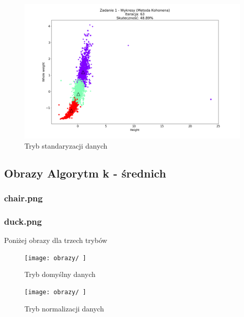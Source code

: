 \documentclass{classrep}
\begin{document}
{{{\begin{figure}[!htbp]
\centering
\includegraphics[width=\textwidth,width=90mm]{wykresy/plot_kohonenAbaloneStandardised.png}
\caption{Tryb standaryzacji danych}
\end{figure}
\FloatBarrier
}

\subsection{Obrazy Algorytm k - średnich}
{
\subsubsection{chair.png}
{
}

\subsubsection{duck.png}
{\iffalse
Poniżej obrazy dla trzech trybów
\begin{figure}[!htbp]
\centering
\texttt{[image: obrazy/ ]}
\caption{Tryb domyślny danych}
\end{figure}

\begin{figure}[!htbp]
\centering
\texttt{[image: obrazy/ ]}
\caption{Tryb normalizacji danych}
\end{figure}

}}}}
\end{document}
